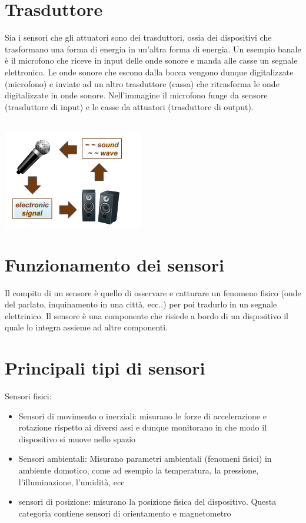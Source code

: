 \section{Trasduttore}
Sia i sensori che gli attuatori sono dei trasduttori, ossia dei dispositivi che trasformano una forma di energia in un'altra forma di energia. Un esempio banale è il microfono che riceve in input delle onde sonore e manda alle casse un segnale elettronico. Le onde sonore che escono dalla bocca vengono dunque digitalizzate (microfono) e inviate ad un altro trasduttore (cassa) che ritrasforma le onde digitalizzate in onde sonore. Nell'immagine il microfono funge da sensore (trasduttore di input) e le casse da attuatori (trasduttore di output).
\\
\\
\begin{center}
    \includegraphics[width = .5\textwidth]{images/lezione9/micro_casse.png}
\end{center}

\newpage
\section{Funzionamento dei sensori}
Il compito di un sensore è quello di osservare e catturare un fenomeno fisico (onde del parlato, inquinamento in una città, ecc..) per poi tradurlo in un segnale elettrinico. Il sensore è una componente che risiede a bordo di un dispositivo il quale lo integra assieme ad altre componenti.

\section{Principali tipi di sensori}
Sensori fisici:
\begin{itemize}
    \item Sensori di movimento o inerziali: misurano le forze di accelerazione e rotazione rispetto ai diversi assi e dunque monitorano in che modo il dispositivo si muove nello spazio
    \item Sensori ambientali: Misurano parametri ambientali (fenomeni fisici) in ambiente domotico, come ad esempio la temperatura, la pressione, l'illuminazione, l'umidità, ecc
    \item sensori di posizione: misurano la posizione fisica del dispositivo. Questa categoria contiene sensori di orientamento e magnetometro
\end{itemize}
\phantom \\

